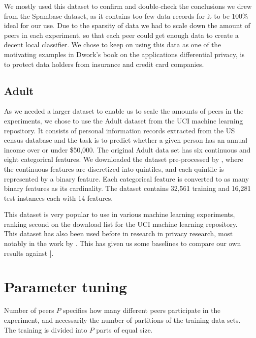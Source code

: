 We mostly used this dataset to confirm and double-check the conclusions we drew from the Spambase dataset, as it contains too few data records for it to be 100\% ideal for our use. Due to the sparsity of data we had to scale down the amount of peers in each experiment, so that each peer could get enough data to create a decent local classifier. We chose to keep on using this data as one of the motivating examples in Dwork's book\citep{dwork2013algorithmic} on the applications differential privacy, is to protect data holders from insurance and credit card companies. 


\subsection{Adult}
As we needed a larger dataset to enable us to scale the amounts of peers in the experiments, we chose to use the Adult dataset from the UCI machine learning repository.  It consists of personal information records extracted from the US census database and the task is to predict whether a given person has an annual income over or under \$50,000. The original Adult data set has six continuous and eight categorical features. We
downloaded the dataset pre-processed by \cite{platt1999fast}, where the continuous features are discretized into quintiles, and each quintile is represented by a binary feature. Each categorical feature is converted to as many binary features as its cardinality. The dataset contains 32,561 training and 16,281 test instances each with 14 features.

This dataset is very popular to use in various machine learning experiments, ranking second on the download list for the UCI machine learning repository. This dataset has also been used before in research in privacy research, most notably in the work by \cite{pathak2010diffprivhomo}. This has given us some baselines to compare our own results against ].

\section{Parameter tuning}
\label{sec:parameter_tuning}
Number of peers $P$ specifies how many different peers participate in the experiment, and necessarily the number of partitions of the training data sets. The training is divided into $P$ parts of equal size.


